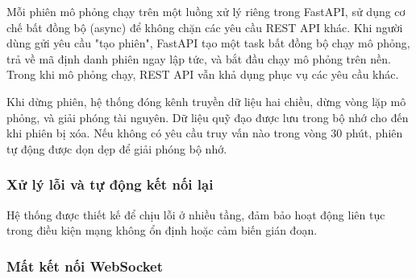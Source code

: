 \begin{table}[H]
\centering
\caption{Các chức năng quản lý phiên qua REST API}
\label{tab:rest-api}
\end{table}

Mỗi phiên mô phỏng chạy trên một luồng xử lý riêng trong FastAPI, sử dụng cơ chế bất đồng bộ (async) để không chặn các yêu cầu REST API khác. Khi người dùng gửi yêu cầu "tạo phiên", FastAPI tạo một task bất đồng bộ chạy mô phỏng, trả về mã định danh phiên ngay lập tức, và bắt đầu chạy mô phỏng trên nền. Trong khi mô phỏng chạy, REST API vẫn khả dụng phục vụ các yêu cầu khác.

Khi dừng phiên, hệ thống đóng kênh truyền dữ liệu hai chiều, dừng vòng lặp mô phỏng, và giải phóng tài nguyên. Dữ liệu quỹ đạo được lưu trong bộ nhớ cho đến khi phiên bị xóa. Nếu không có yêu cầu truy vấn nào trong vòng 30 phút, phiên tự động được dọn dẹp để giải phóng bộ nhớ.

\subsubsection{Xử lý lỗi và tự động kết nối lại}

\hspace{0.5cm} Hệ thống được thiết kế để chịu lỗi ở nhiều tầng, đảm bảo hoạt động liên tục trong điều kiện mạng không ổn định hoặc cảm biến gián đoạn.

\subsubsection{Mất kết nối WebSocket}

